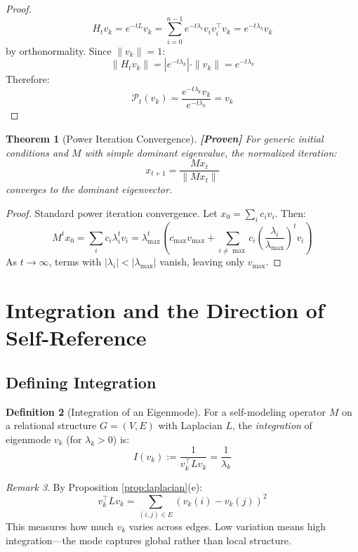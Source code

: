 \documentclass[11pt]{article}
\newtheorem{theorem}{Theorem}[section]
\theoremstyle{definition}
\newtheorem{definition}[theorem]{Definition}
\theoremstyle{remark}
\newtheorem{remark}[theorem]{Remark}
\begin{document}
\begin{proof}
\[
H_t v_k = e^{-tL} v_k = \sum_{i=0}^{n-1} e^{-t\lambda_i} v_i v_i^\top v_k = e^{-t\lambda_k} v_k
\]
by orthonormality. Since $\|v_k\| = 1$:
\[
\|H_t v_k\| = |e^{-t\lambda_k}| \cdot \|v_k\| = e^{-t\lambda_k}
\]
Therefore:
\[
\mathcal{P}_t(v_k) = \frac{e^{-t\lambda_k} v_k}{e^{-t\lambda_k}} = v_k
\]
\end{proof}

\begin{theorem}[Power Iteration Convergence]\label{thm:power_iter}
\textbf{[Proven]} For generic initial conditions and $M$ with simple dominant eigenvalue, the normalized iteration:
\[
x_{t+1} = \frac{Mx_t}{\|Mx_t\|}
\]
converges to the dominant eigenvector.
\end{theorem}

\begin{proof}
Standard power iteration convergence. Let $x_0 = \sum_i c_i v_i$. Then:
\[
M^t x_0 = \sum_i c_i \lambda_i^t v_i = \lambda_{\max}^t \left( c_{\max} v_{\max} + \sum_{i \neq \max} c_i \left(\frac{\lambda_i}{\lambda_{\max}}\right)^t v_i \right)
\]
As $t \to \infty$, terms with $|\lambda_i| < |\lambda_{\max}|$ vanish, leaving only $v_{\max}$.
\end{proof}

\section{Integration and the Direction of Self-Reference}

\subsection{Defining Integration}

\begin{definition}[Integration of an Eigenmode]
For a self-modeling operator $M$ on a relational structure $G = (V, E)$ with Laplacian $L$, the \emph{integration} of eigenmode $v_k$ (for $\lambda_k > 0$) is:
\[
I(v_k) := \frac{1}{v_k^\top L v_k} = \frac{1}{\lambda_k}
\]
\end{definition}

\begin{remark}
By Proposition \ref{prop:laplacian}(e):
\[
v_k^\top L v_k = \sum_{(i,j) \in E} (v_k(i) - v_k(j))^2
\]
This measures how much $v_k$ varies across edges. Low variation means high integration---the mode captures global rather than local structure.
\end{remark}
\end{document}
